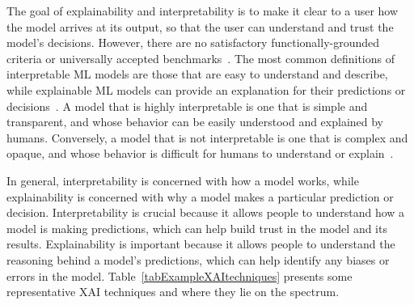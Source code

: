 \documentclass[final,5p,times,twocolumn]{elsarticle}
\begin{document}
The goal of explainability and interpretability is to make it clear to a user how the model arrives at its output, so that the user can understand and trust the model’s decisions. However, there are no satisfactory functionally-grounded criteria or universally accepted benchmarks~\cite{marcinkevivcs2020interpretability}. The most common definitions of interpretable ML models are those that are easy to understand and describe, while explainable ML models can provide an explanation for their predictions or decisions~\cite{rudin2019stop}. A model that is highly interpretable is one that is simple and transparent, and whose behavior can be easily understood and explained by humans. Conversely, a model that is not interpretable is one that is complex and opaque, and whose behavior is difficult for humans to understand or explain~\cite{ribeiro2016model}.

In general, interpretability is concerned with how a model works, while explainability is concerned with why a model makes a particular prediction or decision. Interpretability is crucial because it allows people to understand how a model is making predictions, which can help build trust in the model and its results. Explainability is important because it allows people to understand the reasoning behind a model’s predictions, which can help identify any biases or errors in the model. 
Table~\ref{tabExampleXAItechniques} presents some representative XAI techniques and where they lie on the spectrum.
\end{document}
